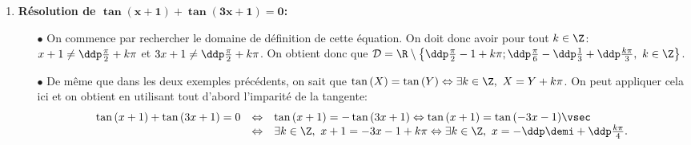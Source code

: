 \begin{correction}
\begin{enumerate}
\begin{minipage}[c]{0.45\textwidth}
\begin{center}
\end{center}
\end{minipage}
\item \textbf{R\'esolution de $\mathbf{\tan{(x+1)}+\tan{(3x+1)}=0}$:}
\begin{itemize}
\item[$\bullet$] On commence par rechercher le domaine de d\'efinition de cette \'equation. On doit donc avoir pour tout $k\in\Z$: $x+1\not= \ddp\frac{\pi}{2}+k\pi$ et $3x+1\not= \ddp\frac{\pi}{2}+k\pi$. On obtient donc que $\mathcal{D}=\R \setminus\left\lbrace  \ddp\frac{\pi}{2}-1+k\pi;\ddp\frac{\pi}{6}-\ddp\frac{1}{3}+\ddp\frac{k\pi}{3},\ k\in\Z  \right\rbrace$. 
\item[$\bullet$] De m\^{e}me que dans les deux exemples pr\'ec\'edents, on sait que $\tan{(X)}=\tan{(Y)}\Leftrightarrow \exists k\in\Z,\ X=Y+k\pi$. On peut appliquer cela ici et on obtient en utilisant tout d'abord l'imparit\'e de la tangente:
$$\begin{array}{lll} \tan{(x+1)}+\tan{(3x+1)}=0&\Leftrightarrow &\tan{(x+1)}=-\tan{(3x+1)} \Leftrightarrow  \tan{(x+1)}=\tan{(-3x-1)} \vsec\\
&\Leftrightarrow &\exists k\in\Z,\ x+1=-3x-1+k\pi\Leftrightarrow \exists k\in\Z,\ x=-\ddp\demi+\ddp\frac{k\pi}{4}.\end{array}$$
\end{itemize}
\begin{minipage}[c]{0.45\textwidth}

\end{minipage}
\end{enumerate}
\end{correction}
